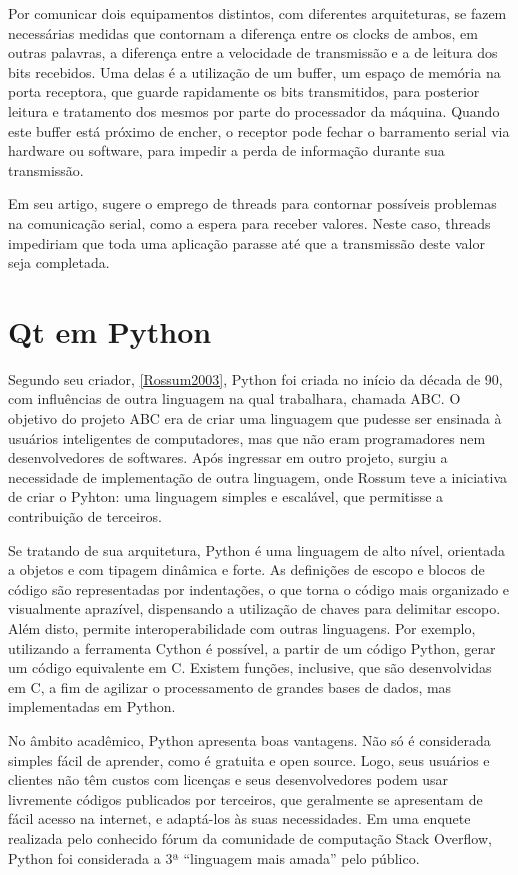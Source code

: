 Por comunicar dois equipamentos distintos, com diferentes arquiteturas, se fazem necessárias medidas que contornam a diferença entre os clocks de ambos, em outras palavras, a diferença entre a velocidade de transmissão e a de leitura dos bits recebidos. Uma delas é a utilização de um buffer, um espaço de memória na porta receptora, que guarde rapidamente os bits transmitidos, para posterior leitura e tratamento dos mesmos por parte do processador da máquina. Quando este buffer está próximo de encher, o receptor pode fechar o barramento serial via hardware ou software, para impedir a perda de informação durante sua transmissão.

Em seu artigo, \cite{Denver1995} sugere o emprego de threads para contornar possíveis problemas na comunicação serial, como a espera para receber valores. Neste caso, threads impediriam que toda uma aplicação parasse até que a transmissão deste valor seja completada. 

\section{Qt em Python}

Segundo seu criador, \ref{Rossum2003}, Python foi criada no início da década de 90, com influências de outra linguagem na qual trabalhara, chamada ABC. O objetivo do projeto ABC era de criar uma linguagem que pudesse ser ensinada à usuários inteligentes de computadores, mas que não eram programadores nem desenvolvedores de softwares. Após ingressar em outro projeto, surgiu a necessidade de implementação de outra linguagem, onde Rossum teve a iniciativa de criar o Pyhton: uma  linguagem simples e escalável, que permitisse a contribuição de terceiros.

Se tratando de sua arquitetura, Python é uma linguagem de alto nível, orientada a objetos e com tipagem dinâmica e forte. As definições de escopo e blocos de código são representadas por indentações, o que torna o código mais organizado e visualmente aprazível, dispensando a utilização de chaves para delimitar escopo. Além disto, permite interoperabilidade com outras linguagens. Por exemplo, utilizando a ferramenta Cython é possível, a partir de um código Python, gerar um código equivalente em C. Existem funções, inclusive, que são desenvolvidas em C, a fim de agilizar o processamento de grandes bases de dados, mas implementadas em Python.

No âmbito acadêmico, Python apresenta boas vantagens. Não só é considerada simples fácil de aprender, como é gratuita e open source. Logo, seus usuários e clientes não têm custos com licenças e seus desenvolvedores podem usar livremente códigos publicados por terceiros, que geralmente se apresentam de fácil acesso na internet, e adaptá-los às suas necessidades. Em uma enquete realizada pelo conhecido fórum da comunidade de computação Stack Overflow, Python foi considerada a 3ª “linguagem mais amada” pelo público.

